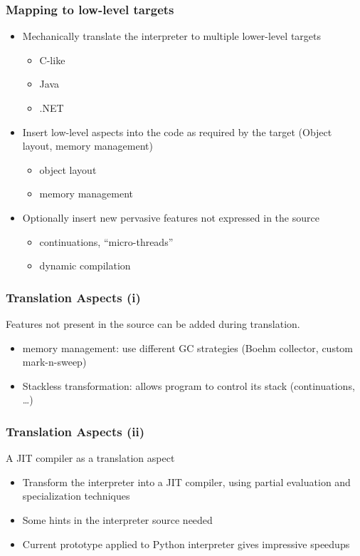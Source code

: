 \documentclass[utf8]{beamer}
\begin{document}
\begin{frame}
  \frametitle{Mapping to low-level targets}
  \begin{itemize}
  \item
    Mechanically translate the interpreter to multiple
    lower-level targets
    \begin{itemize}
    \item C-like
    \item Java
    \item .NET
    \end{itemize}
  \item
    Insert low-level aspects into the code as required by
    the target (Object layout, memory management)
    \begin{itemize}
    \item object layout
    \item memory management
    \end{itemize}  \item
    Optionally insert new pervasive features not expressed
    in the source
    \begin{itemize}
    \item continuations, ``micro-threads''
    \item dynamic compilation
    \end{itemize}
  \end{itemize}
\end{frame}



\begin{frame}
  \frametitle{Translation Aspects (i)}
  Features not present in the source can be added during translation.
  \begin{itemize}
  \item
    \alert{memory management}: use different GC strategies (Boehm collector, custom mark-n-sweep)
  \item
    \alert{Stackless transformation}: allows program to control its stack (continuations, \dots)
  \end{itemize}
\end{frame}


\begin{frame}
  \frametitle{Translation Aspects (ii)}
  A \alert{JIT compiler} as a translation aspect
  \begin{itemize}
  \item
    Transform the interpreter into a JIT compiler, using partial evaluation and
    specialization techniques
  \item
    Some hints in the interpreter source needed
  \item
    Current prototype applied to Python interpreter gives impressive speedups
  \end{itemize}
\end{frame}
\end{document}

